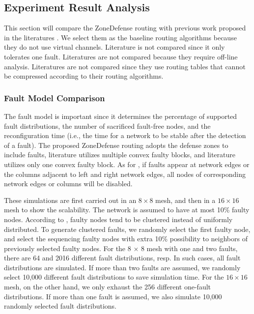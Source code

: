 \subsection{Experiment Result Analysis}
This section will compare the ZoneDefense routing with previous work proposed in the literatures \cite{wu2003fault} \cite{zhang2008reconfigurable}. We select them  as the baseline routing algorithms because they do not use virtual channels. Literature \cite{glass1993fault} is not compared since it only tolerates one fault. Literatures \cite{fu2011new} \cite{mejia2006segment} \cite{rodrigo2010addressing} are not compared because they require off-line analysis. Literatures \cite{fick2009highly} \cite{fick2009vicis} are not compared since they use routing tables that cannot be compressed according to their routing algorithms.

\subsubsection{Fault Model Comparison}
The fault model is important since it determines the percentage of supported fault distributions, the number of sacrificed fault-free nodes, and the reconfiguration time (i.e., the time for a network to be stable after the detection of a fault). The proposed ZoneDefense routing adopts the defense zones to include faults, literature \cite{wu2003fault} utilizes multiple convex faulty blocks, and literature \cite{zhang2008reconfigurable} utilizes only one convex faulty block. As for \cite{wu2003fault}, if faults appear at network edges or the columns adjacent to left and right network edges, all nodes of corresponding network edges or columns will be disabled.

These simulations are first carried out in an $8 \times 8$ mesh, and then in a $16 \times 16$ mesh to show the scalability. The network is assumed to have at most 10\% faulty nodes. According to \cite{meyer1989modeling}, faulty nodes tend to be clustered instead of uniformly distributed. To generate clustered faults, we randomly select the first faulty node, and select the sequencing faulty nodes with extra 10\% possibility to neighbors of previously selected faulty nodes. For the 8 × 8 mesh with one and two faults, there are 64 and 2016 different fault distributions, resp. In such cases, all fault distributions are simulated. If more than two faults are assumed, we randomly select 10,000 different fault distributions to save simulation time. For the $16 \times 16$ mesh, on the other hand, we only exhaust the 256 different one-fault distributions. If more than one fault is assumed, we also simulate 10,000 randomly selected fault distributions.

